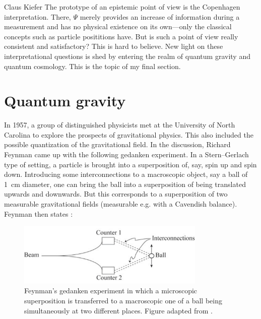 \begin{artengenv}{Claus Kiefer}
The prototype of an epistemic point of view is the Copenhagen
interpretation. There, $\Psi$ merely provides an increase of information
during a measurement and has no physical existence on its own---only
the classical concepts such as particle posititions have. But is such
a point of view really consistent and satisfactory?  This is hard to
believe. New light on these interpretational questions is shed by
entering the realm of quantum gravity and quantum cosmology. This is
the topic of my final section.

 

\section{Quantum gravity}


In 1957, a group of distinguished physicists met at the University of
North Carolina to explore the prospects of gravitational physics.
This also included the possible quantization of the
gravitational field. In the discussion, Richard Feynman came up with
the following 
gedanken experiment. In a Stern--Gerlach type of setting, a particle
is brought into a superposition of, say, spin up and spin
down. Introducing some interconnections to a macroscopic object, say
a ball of 1~cm diameter, one can bring the ball into a superposition of being
translated upwards and downwards. But this corresponds to a
superposition of two measurable gravitational fields (measurable e.g. with a
Cavendish balance). Feynman then states \parencite{de_witt_proceedings:_1957}:


\begin{figure}[h]
	\centering
   \includegraphics[width=0.8\textwidth]{ART_Kiefer/Kiefer_img.pdf} 
\caption{Feynman's gedanken experiment in which a microscopic
  superposition is transferred to a macroscopic one of a ball being
  simultaneously at two different places. Figure adapted from \parencite{de_witt_proceedings:_1957}.}
\end{figure}


\end{artengenv}
